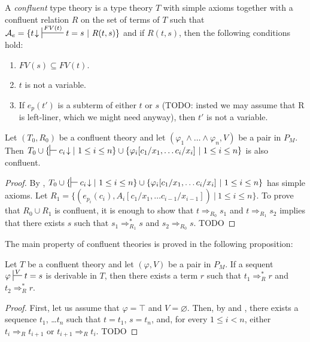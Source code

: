 \documentclass[reqno]{amsart}
\theoremstyle{definition}
\theoremstyle{remark}
\numberwithin{figure}{section}
\begin{document}
\begin{defn}
A \emph{confluent} type theory is a type theory $T$ with simple axioms together with a confluent relation $R$ on the set of terms of $T$
such that $\mathcal{A}_e = \{ t\!\downarrow\ \sststile{}{FV(t)} t = s\ |\ R(t,s) \}$ and if $R(t,s)$, then the following conditions hold:
\begin{enumerate}
\item $FV(s) \subseteq FV(t)$.
\item $t$ is not a variable.
\item If $e_p(t')$ is a subterm of either $t$ or $s$ (TODO: insted we may assume that R is left-liner, which we might need anyway), then $t'$ is not a variable.
\end{enumerate}
\end{defn}

\begin{lem}
Let $(T_0,R_0)$ be a confluent theory and let $(\varphi_1 \land \ldots \land \varphi_n, V)$ be a pair in $P_M$.
Then $T_0 \cup \{ \sststile{}{} c_i\!\downarrow |\ 1 \leq i \leq n \} \cup \{ \varphi_i[c_1/x_1, \ldots c_i/x_i]\ |\ 1 \leq i \leq n \}$ is also confluent.
\end{lem}
\begin{proof}
By , $T_0 \cup \{ \sststile{}{} c_i\!\downarrow |\ 1 \leq i \leq n \} \cup \{ \varphi_i[c_1/x_1, \ldots c_i/x_i]\ |\ 1 \leq i \leq n \}$ has simple axioms.
Let $R_1 = \{ (e_{p_i}(c_i), A_i[c_1/x_1, \ldots c_{i-1}/x_{i-1}])\ |\ 1 \leq i \leq n \}$.
To prove that $R_0 \cup R_1$ is confluent, it is enough to show that $t \Rightarrow_{R_0} s_1$ and $t \Rightarrow_{R_1} s_2$ implies that there exists $s$ such that $s_1 \Rightarrow_{R_1}^* s$ and $s_2 \Rightarrow_{R_0} s$.
TODO
\end{proof}

The main property of confluent theories is proved in the following proposition:

\begin{prop}
Let $T$ be a confluent theory and let $(\varphi,V)$ be a pair in $P_M$.
If a sequent $\varphi \sststile{}{V} t = s$ is derivable in $T$, then there exists a term $r$ such that $t_1 \Rightarrow_R^* r$ and $t_2 \Rightarrow_R^* r$.
\end{prop}
\begin{proof}
First, let us assume that $\varphi = \top$ and $V = \varnothing$.
Then, by  and , there exists a sequence $t_1$, \ldots $t_n$ such that $t = t_1$, $s = t_n$, and, for every $1 \leq i < n$, either $t_i \Rightarrow_R t_{i+1}$ or $t_{i+1} \Rightarrow_R t_i$.
TODO
\end{proof}
\end{document}
